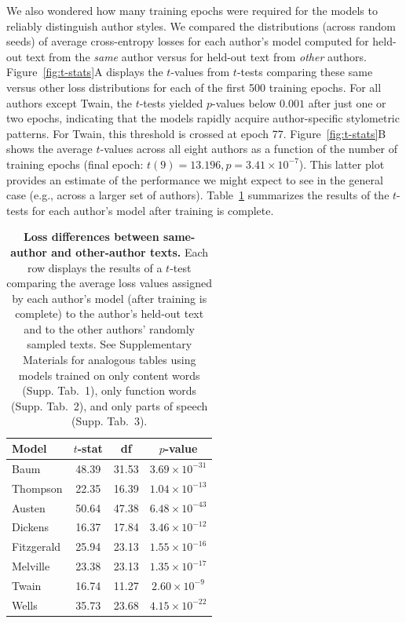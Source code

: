 \documentclass[11pt]{article}
\newcommand{\authortableContent}{{1}}
\newcommand{\authortableFunction}{{2}}
\newcommand{\authortablePOS}{{3}}
\begin{document}
We also wondered how many training epochs were required for the models to
reliably distinguish author styles. We compared the distributions (across
random seeds) of average cross-entropy losses for each author's model computed
for held-out text from the \textit{same} author versus for held-out text from
\textit{other} authors. Figure~\ref{fig:t-stats}A displays the $t$-values from
$t$-tests comparing these same versus other loss distributions for each of the
first 500 training epochs. For all authors except Twain, the $t$-tests yielded
$p$-values below $0.001$ after just one or two epochs, indicating that the models
rapidly acquire author-specific stylometric patterns. For Twain, this threshold
is crossed at epoch 77. Figure~\ref{fig:t-stats}B shows the average $t$-values
across all eight authors as a function of the number of training epochs (final
epoch: $t(9) = 13.196, p = 3.41 \times 10^{-7}$). This latter plot provides an
estimate of the performance we might expect to see in the general case (e.g.,
across a larger set of authors). Table~\ref{tab:t-tests} summarizes the results
of the $t$-tests for each author's model after training is complete.

\begin{table}[h]
\centering
\small
\begin{tabular}{lccc}
\hline
\textbf{Model} & \textbf{$t$-stat} & \textbf{df} & \textbf{$p$-value}\\
\hline
Baum        & 48.39 & 31.53 & $3.69 \times 10^{-31}$  \\
Thompson    & 22.35 & 16.39 & $1.04 \times 10^{-13}$ \\
Austen      & 50.64 & 47.38 & $6.48 \times 10^{-43}$ \\
Dickens     & 16.37 & 17.84 & $3.46 \times 10^{-12}$ \\
Fitzgerald  & 25.94 & 23.13 & $1.55 \times 10^{-16}$ \\
Melville    & 23.38 & 23.13 & $1.35 \times 10^{-17}$ \\
Twain       & 16.74 & 11.27 & $2.60 \times 10^{-9}$ \\
Wells       & 35.73 & 23.68 & $4.15 \times 10^{-22}$ \\
\hline
\end{tabular}

\caption{\textbf{Loss differences between same-author and other-author texts.}
Each row displays the results of a $t$-test comparing the average loss values
assigned by each author's model (after training is complete) to the author's
held-out text and to the other authors' randomly sampled texts. See
Supplementary Materials for analogous tables using models trained on only
content words (Supp. Tab.~\authortableContent), only function words (Supp.
Tab.~\authortableFunction), and only parts of speech (Supp.
Tab.~\authortablePOS).}

\label{tab:t-tests}
\end{table}
\end{document}
